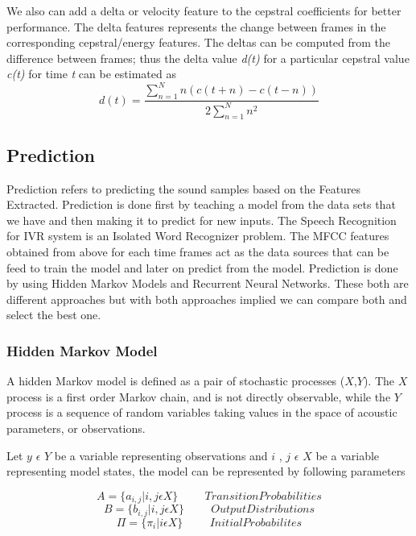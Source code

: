 We also can add a delta or velocity feature to the cepstral coefficients for better performance. The delta features represents the change between frames in the corresponding cepstral/energy features. The deltas can be computed from the difference between frames; thus the delta value \textit{d(t)} for a particular cepstral value \textit{c(t)} for time \textit{t} can be estimated as
\begin{equation}
d(t) = \frac{\sum_{n=1}^{N}n(c(t+n) - c(t-n))}{2 \sum_{n=1}^{N}n^2}
\end{equation}


\subsection{Prediction}

Prediction refers to predicting the sound samples based on the Features Extracted. Prediction is done first by teaching a model from the data sets that we have and then making it to predict for new inputs. The Speech Recognition for IVR system is an Isolated Word Recognizer problem. The MFCC features obtained from above for each time frames act as the data sources that can be feed to train the model and later on predict from the model. Prediction is done by using Hidden Markov Models and Recurrent Neural Networks. These both are different approaches but with both approaches implied we can compare both and select the best one.


\subsubsection{Hidden Markov Model}


A hidden Markov model is defined as a pair of stochastic processes ($X$,$Y$). The $X$ process is
a first order Markov chain, and is not directly observable, while the $Y$ process is a sequence
of random variables taking values in the space of acoustic parameters, or observations.

Let $y$ $\epsilon$  $Y$ be a variable representing observations and $i$ , $j$ $\epsilon$  $X$ be a variable representing model states, the model can be represented by following parameters

\[ A = \{a _{i,j} | i,j \epsilon X \} \hspace{1cm}   Transition Probabilities \]
\[ B = \{b _{i,j} | i,j \epsilon X \} \hspace{1cm}   Output Distributions \]
\[  \Pi  = \{\pi _{i} | i \epsilon X \}  \hspace{1cm}  Initial Probabilites \]


